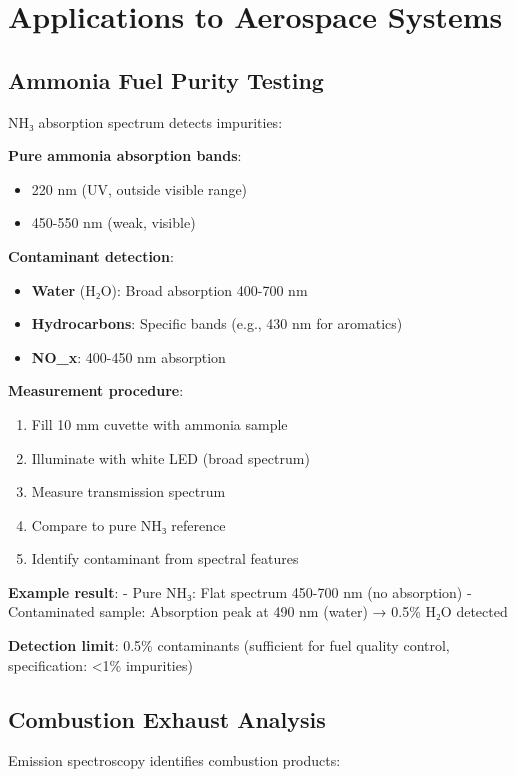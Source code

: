 \documentclass[12pt,a4paper]{article}
\begin{document}
\section{Applications to Aerospace Systems}

\subsection{Ammonia Fuel Purity Testing}

NH₃ absorption spectrum detects impurities:

\textbf{Pure ammonia absorption bands}:
\begin{itemize}
\item 220 nm (UV, outside visible range)
\item 450-550 nm (weak, visible)
\end{itemize}

\textbf{Contaminant detection}:
\begin{itemize}
\item \textbf{Water} (H₂O): Broad absorption 400-700 nm
\item \textbf{Hydrocarbons}: Specific bands (e.g., 430 nm for aromatics)
\item \textbf{NO_x}: 400-450 nm absorption
\end{itemize}

\textbf{Measurement procedure}:
\begin{enumerate}
\item Fill 10 mm cuvette with ammonia sample
\item Illuminate with white LED (broad spectrum)
\item Measure transmission spectrum
\item Compare to pure NH₃ reference
\item Identify contaminant from spectral features
\end{enumerate}

\textbf{Example result}:
- Pure NH₃: Flat spectrum 450-700 nm (no absorption)
- Contaminated sample: Absorption peak at 490 nm (water) → 0.5\% H₂O detected

\textbf{Detection limit}: 0.5\% contaminants (sufficient for fuel quality control, specification: <1\% impurities)

\subsection{Combustion Exhaust Analysis}

Emission spectroscopy identifies combustion products:
\end{document}

